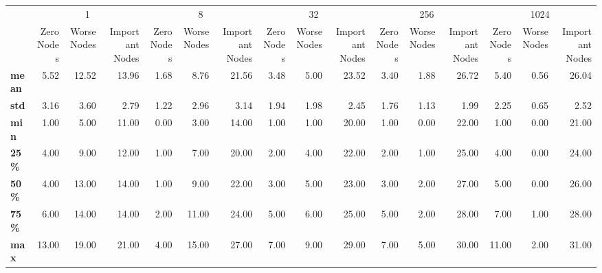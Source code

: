 \begin{tabular}{lrrrrrrrrrrrrrrr}
\toprule
{} & \multicolumn{3}{c}{1} & \multicolumn{3}{c}{8} & \multicolumn{3}{c}{32} & \multicolumn{3}{c}{256} & \multicolumn{3}{c}{1024} \\
{} & Zero Nodes & Worse Nodes & Important Nodes & Zero Nodes & Worse Nodes & Important Nodes & Zero Nodes & Worse Nodes & Important Nodes & Zero Nodes & Worse Nodes & Important Nodes & Zero Nodes & Worse Nodes & Important Nodes \\
\midrule
\textbf{mean} &       5.52 &       12.52 &           13.96 &       1.68 &        8.76 &           21.56 &       3.48 &        5.00 &           23.52 &       3.40 &        1.88 &           26.72 &       5.40 &        0.56 &           26.04 \\
\textbf{std } &       3.16 &        3.60 &            2.79 &       1.22 &        2.96 &            3.14 &       1.94 &        1.98 &            2.45 &       1.76 &        1.13 &            1.99 &       2.25 &        0.65 &            2.52 \\
\textbf{min } &       1.00 &        5.00 &           11.00 &       0.00 &        3.00 &           14.00 &       1.00 &        1.00 &           20.00 &       1.00 &        0.00 &           22.00 &       1.00 &        0.00 &           21.00 \\
\textbf{25\% } &       4.00 &        9.00 &           12.00 &       1.00 &        7.00 &           20.00 &       2.00 &        4.00 &           22.00 &       2.00 &        1.00 &           25.00 &       4.00 &        0.00 &           24.00 \\
\textbf{50\% } &       4.00 &       13.00 &           14.00 &       1.00 &        9.00 &           22.00 &       3.00 &        5.00 &           23.00 &       3.00 &        2.00 &           27.00 &       5.00 &        0.00 &           26.00 \\
\textbf{75\% } &       6.00 &       14.00 &           14.00 &       2.00 &       11.00 &           24.00 &       5.00 &        6.00 &           25.00 &       5.00 &        2.00 &           28.00 &       7.00 &        1.00 &           28.00 \\
\textbf{max } &      13.00 &       19.00 &           21.00 &       4.00 &       15.00 &           27.00 &       7.00 &        9.00 &           29.00 &       7.00 &        5.00 &           30.00 &      11.00 &        2.00 &           31.00 \\
\bottomrule
\end{tabular}
